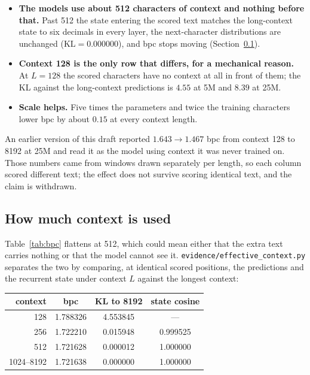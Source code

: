\documentclass[10pt]{article}
\begin{document}
\begin{itemize}[leftmargin=*,itemsep=2pt]
  \item \textbf{The models use about 512 characters of context and nothing before that.} Past 512 the
        state entering the scored text matches the long-context state to six decimals in every layer,
        the next-character distributions are unchanged ($\mathrm{KL}=0.000000$), and bpc stops moving
        (Section~\ref{sec:context}).
  \item \textbf{Context 128 is the only row that differs, for a mechanical reason.} At $L=128$ the
        scored characters have no context at all in front of them; the KL against the long-context
        predictions is $4.55$ at 5M and $8.39$ at 25M.
  \item \textbf{Scale helps.} Five times the parameters and twice the training characters lower bpc by
        about $0.15$ at every context length.
\end{itemize}

An earlier version of this draft reported $1.643\to1.467$ bpc from context 128 to 8192 at 25M and read
it as the model using context it was never trained on. Those numbers came from windows drawn separately
per length, so each column scored different text; the effect does not survive scoring identical text,
and the claim is withdrawn.

\subsection{How much context is used}
\label{sec:context}

Table~\ref{tab:bpc} flattens at 512, which could mean either that the extra text carries nothing or
that the model cannot see it. \texttt{evidence/effective\_context.py} separates the two by comparing,
at identical scored positions, the predictions and the recurrent state under context $L$ against the
longest context:

\begin{center}\small
\begin{tabular}{@{}rccc@{}}
\toprule
context & bpc & KL to 8192 & state cosine \\
\midrule
128 & 1.788326 & 4.553845 & --- \\
256 & 1.722210 & 0.015948 & 0.999525 \\
512 & 1.721628 & 0.000012 & 1.000000 \\
1024--8192 & 1.721638 & 0.000000 & 1.000000 \\
\bottomrule
\end{tabular}
\end{center}
\end{document}

